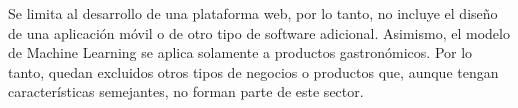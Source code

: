 Se limita al desarrollo de una plataforma web, por lo tanto, no incluye el diseño de una aplicación móvil o de otro tipo de software adicional. Asimismo, el modelo de Machine Learning se aplica solamente a productos gastronómicos. Por lo tanto, quedan excluidos otros tipos de negocios o productos que, aunque tengan características semejantes, no forman parte de este sector.
